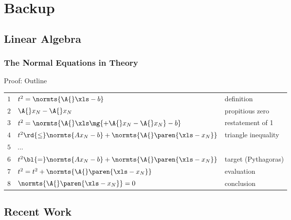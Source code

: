 % 

\section{Backup}

\subsection{Linear Algebra}
%
\begin{frame}\frametitle{The Normal Equations in Theory}
Proof: Outline
\begin{table}[htp]
\begin{center}
\begin{tabular}{lll}
	$1$ & $t^{2}= \normts{\A{}\xls - b}$ & definition \\[5pt]
	$2$ & $\A{}x_{N} - \A{}x_{N}$ & propitious zero \\[5pt]
	$3$ & $t^{2}= \normts{\A{}\xls \mg{+ \A{}x_{N} - \A{}x_{N}} - b}$ & restatement of 1 \\[5pt]
	$4$ & $t^{2} \rd{\le} \normts{A{}x_{N} - b} + \normts{\A{}\paren{\xls -x_{N}}}$ & triangle inequality \\[5pt]
	$5$ & $...$ & \bl{Miracle}\\[5pt]
	$6$ & $t^{2} \bl{=} \normts{A{}x_{N} - b} + \normts{\A{}\paren{\xls -x_{N}}}$ & target (Pythagoras)\\[5pt]
	$7$ & $t^{2} = t^{2} + \normts{\A{}\paren{\xls -x_{N}}}$ & evaluation\\[5pt]
	$8$ & $\normts{\A{}\paren{\xls -x_{N}}} = 0$ & conclusion\\
\end{tabular}
\end{center}
\end{table}%
\end{frame}

\subsection{Recent Work}

\endinput  %
